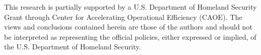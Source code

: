 \documentclass[manuscript, nonacm]{acmart}
\begin{document}
This research is partially 
supported by a U.S. Department of Homeland Security Grant through 
Center for Accelerating Operational Efficiency (CAOE).
The views and conclusions contained herein are those of the authors and should not be interpreted as  representing the official policies, either expressed or implied, of the U.S. Department of Homeland Security.












\end{document}
